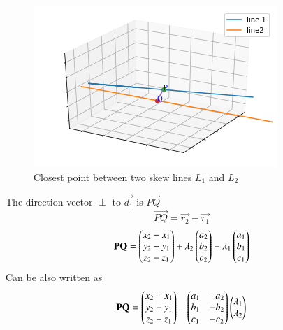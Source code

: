 \documentclass[journal,12pt,twocolumn]{IEEEtran}
\begin{document}
\begin{figure}[h]
    \centering
    \includegraphics[width=\columnwidth]{fig/figure1.png}
    \caption{Closest point between two skew lines $L_1$ and $L_2$}
    \label{fig:1}
\end{figure}
The direction vector $\perp$ to $\vec{d_1}$ is $\vec{PQ}$
\begin{equation}
    \vec{PQ} = \vec{r_2} - \vec{r_1}
\end{equation}
\begin{equation}
    \mathbf{PQ} = \begin{pmatrix}x_2 - x_1\\y_2 - y_1\\z_2 - z_1\end{pmatrix} + \lambda{_2}\begin{pmatrix}a_2\\b_2\\c_2\end{pmatrix} -  \lambda{_1}\begin{pmatrix}a_1\\b_1\\c_1\end{pmatrix}
\end{equation}
Can be also written as
\begin{equation}
    \mathbf{PQ} = \begin{pmatrix}x_2 - x_1\\y_2 - y_1\\z_2 - z_1\end{pmatrix} - \begin{pmatrix}a_1 & -a_2\\b_1 & -b_2\\c_1 & -c_2\end{pmatrix}\begin{pmatrix}\lambda{_1}\\\lambda{_2}\end{pmatrix}
\end{equation}
\end{document}
